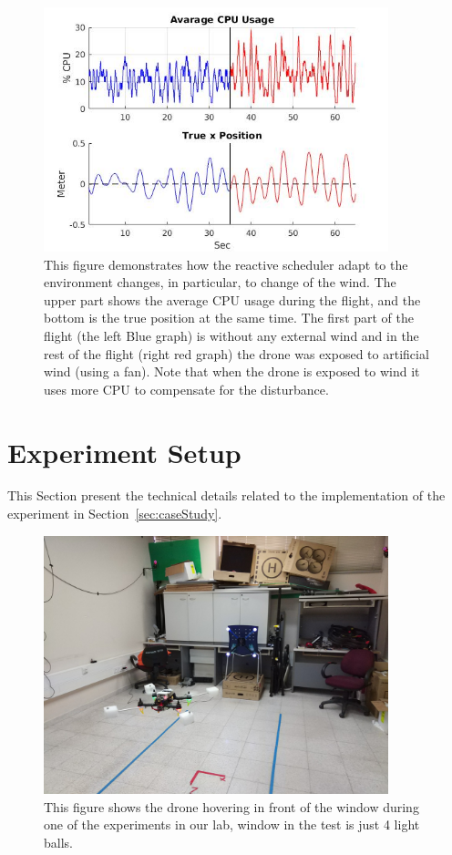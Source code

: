 \documentclass[ twoside, 12pt ]{article}
\begin{document}
\begin{figure} %
    \centerline{\includegraphics[width=100mm]{windPlot15.jpg}}
    \caption{This figure demonstrates how the reactive scheduler adapt to the environment changes, in particular, to change of the wind. The upper part shows the average CPU usage during the flight, and the bottom is the true position at the same time. The first part of the flight (the left Blue graph) is without any external wind and in the rest of the flight (right red graph)  the drone was exposed to artificial wind (using a fan). Note that when the drone is exposed to wind it uses more CPU to compensate for the disturbance.}
    \label{fig:windPlot}
\end{figure}

\section{Experiment Setup}
\label{sec:Experiment setup}

This Section present the technical details related to the implementation of the experiment in Section~\ref{sec:caseStudy}.

\begin{figure} %
    \centerline{\includegraphics[width=100mm]{hover_in_lab.jpg}}
    \caption{This figure shows the drone hovering in front of the window during one of the experiments in our lab, window in the test is just 4 light balls.}
    \label{fig:hover_in_lab}
\end{figure}
\end{document}
